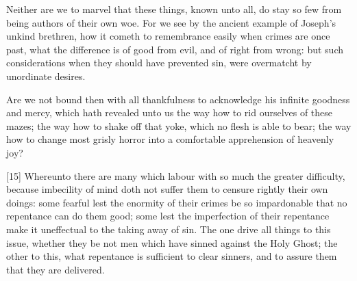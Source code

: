 Neither are we to marvel that these things, known unto all, do stay so few from being authors of their own woe. For we see by the ancient example of Joseph’s unkind brethren, how it cometh to remembrance easily when crimes are once past, what the difference is of good from evil, and of right from wrong: but such considerations when they should have prevented sin, were overmatcht by unordinate desires.

Are we not bound then with all thankfulness to acknowledge his infinite goodness and mercy, which hath revealed unto us the way how to rid ourselves of these mazes; the way how to shake off that yoke, which no flesh is able to bear; the way how to change most grisly horror into a comfortable apprehension of heavenly joy?

[15] Whereunto there are many which labour with so much the greater difficulty, because imbecility of mind doth not suffer them to censure rightly their own doings: some fearful lest the enormity of their crimes be so impardonable that no repentance can do them good; some lest the imperfection of their repentance make it uneffectual to the taking away of sin. The one drive all things to this issue, whether  they be not men which have sinned against the Holy Ghost; the other to this, what repentance is sufficient to clear sinners, and to assure them that they are delivered.

